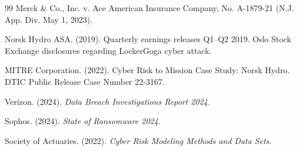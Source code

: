 \documentclass[a4paper,11pt]{article}
\theoremstyle{definition}
\begin{document}
\begin{thebibliography}{99}
Merck \& Co., Inc. v. Ace American Insurance Company,
No. A-1879-21 (N.J. App. Div. May 1, 2023).

Norsk Hydro ASA. (2019).
Quarterly earnings releases Q1--Q2 2019.
Oslo Stock Exchange disclosures regarding LockerGoga cyber attack.

MITRE Corporation. (2022).
Cyber Risk to Mission Case Study: Norsk Hydro.
DTIC Public Release Case Number 22-3167.

Verizon. (2024). \textit{Data Breach Investigations Report 2024}.

Sophos. (2024). \textit{State of Ransomware 2024}.

Society of Actuaries. (2022). \textit{Cyber Risk Modeling Methods and Data Sets}.

\end{thebibliography}
\end{document}
